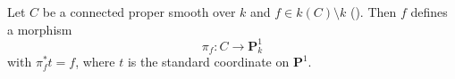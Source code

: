 \begin{lemma}
\label{lem:pcb-rational-function-morphism}
Let \(C\) be a connected proper smooth  over
\(k\) and \(f\in k(C)\setminus k\) ().
Then \(f\) defines a morphism
\[
 \pi_f:C\to\mathbf P^1_k
\]
with \(\pi_f^*t=f\), where \(t\) is the standard coordinate on
\(\mathbf P^1\).
\end{lemma}

